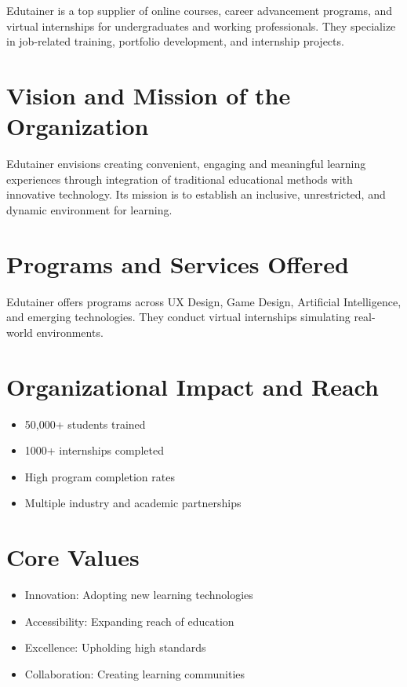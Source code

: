 \documentclass[12pt,a4paper]{report}
\begin{document}
Edutainer is a top supplier of online courses, career advancement programs, and virtual internships for undergraduates and working professionals. They specialize in job-related training, portfolio development, and internship projects.




\section{Vision and Mission of the Organization}

Edutainer envisions creating convenient, engaging and meaningful learning experiences through integration of traditional educational methods with innovative technology. Its mission is to establish an inclusive, unrestricted, and dynamic environment for learning.


\section{Programs and Services Offered}

Edutainer offers programs across UX Design, Game Design, Artificial Intelligence, and emerging technologies. They conduct virtual internships simulating real-world environments.


\section{Organizational Impact and Reach}
\begin{itemize}[leftmargin=1.5em]
    \item 50,000+ students trained
    \item 1000+ internships completed
    \item High program completion rates
    \item Multiple industry and academic partnerships
\end{itemize}

\section{Core Values}
\begin{itemize}[leftmargin=1.5em]
    \item Innovation: Adopting new learning technologies
    \item Accessibility: Expanding reach of education
    \item Excellence: Upholding high standards
    \item Collaboration: Creating learning communities
\end{itemize}
\end{document}
